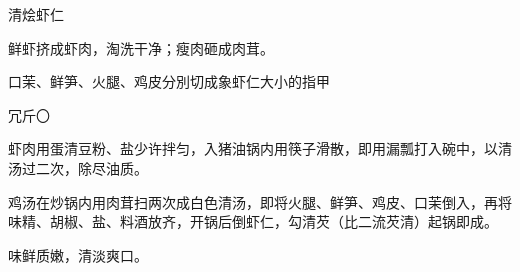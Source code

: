 \begin{recipe}{清烩虾仁}

\ingredients




\cooking

\step 鲜虾挤成虾肉，淘洗干净；瘦肉砸成肉茸。

\step 口茉、鲜笋、火腿、鸡皮分別切成象虾仁大小的指甲

冗斤〇

\step 虾肉用蛋清豆粉、盐少许拌匀，入猪油锅内用筷子滑散，即用漏瓢打入碗中，以清汤过二次，除尽油质。

\step 鸡汤在炒锅内用肉茸扫两次成白色清汤，即将火腿、鲜笋、鸡皮、口茉倒入，再将味精、胡椒、盐、料酒放齐，开锅后倒虾仁，勾清芡（比二流芡清）起锅即成。

\notes

味鲜质嫩，清淡爽口。

\end{recipe}

